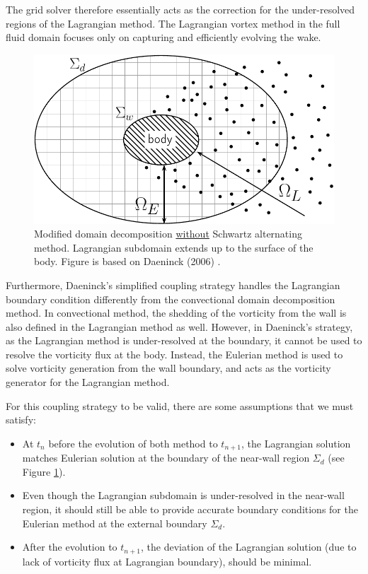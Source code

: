 	The grid solver therefore essentially acts as the correction for the under-resolved regions of the Lagrangian method. The Lagrangian vortex method in the full fluid domain focuses only on capturing and efficiently evolving the wake.
	
		\begin{figure}[!h]
			\centering
			\includegraphics[width=0.6\linewidth]{figures/hybrid/domainDecomposition_daenick_type2-crop.pdf}
			\caption{Modified domain decomposition \underline{without} Schwartz alternating method. Lagrangian subdomain extends up to the surface of the body. Figure is based on Daeninck (2006) \cite{Daeninck2006}.}
			\label{fig:domainDecomposition_daenick}
		\end{figure}	
	
	Furthermore, Daeninck's simplified coupling strategy handles the Lagrangian boundary condition differently from the convectional domain decomposition method. In convectional method, the shedding of the vorticity from the wall is also defined in the Lagrangian method as well. However, in Daeninck's strategy, as the Lagrangian method is under-resolved at the boundary, it cannot be used to resolve the vorticity flux at the body. Instead, the Eulerian method is used to solve vorticity generation from the wall boundary, and acts as the vorticity generator for the Lagrangian method. 
	
	For this coupling strategy to be valid, there are some assumptions that we must satisfy:

	\begin{itemize}
	\item At $t_n$ before the evolution of both method to $t_{n+1}$, the Lagrangian solution matches Eulerian solution at the boundary of the near-wall region $\Sigma_d$ (see Figure \ref{fig:domainDecomposition_daenick}).
	\item Even though the Lagrangian subdomain is under-resolved in the near-wall region, it should still be able to provide accurate boundary conditions for the Eulerian method at the external boundary $\Sigma_d$.
	\item After the evolution to $t_{n+1}$, the deviation of the Lagrangian solution (due to lack of vorticity flux at Lagrangian boundary), should be minimal.
	\end{itemize}	
	
